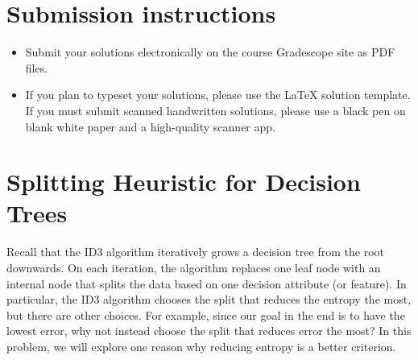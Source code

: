 \documentclass[11pt]{article}
\begin{document}
\author{}
\date{}
\vspace{-1in}
\maketitle
\vspace{-0.75in}


\ifsoln
\else
\section*{Submission instructions}
\begin{itemize}
\item 
Submit your solutions electronically on the course Gradescope site as PDF files.
\item If you plan to typeset your solutions, please use the LaTeX solution template. If you must submit scanned handwritten solutions, please use a black pen on blank white paper and a high-quality scanner app.
\end{itemize}
\fi

\ifnotsolution{\newpage}
\section{Splitting Heuristic for Decision Trees }
Recall that the ID3 algorithm iteratively grows a decision tree from the root downwards. On each iteration, the algorithm replaces one leaf node with an internal node that splits the data based on one decision attribute (or feature). In particular, the ID3 algorithm chooses the split that reduces the entropy the most, but there are other choices. For example, since our goal in the end is to have the lowest error, why not instead choose the split that reduces error the most? In this problem, we will explore one reason why reducing entropy is a better criterion.
\end{document}
